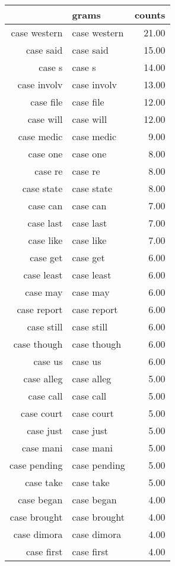 \begin{table}[ht]
\centering
\begin{tabular}{rlr}
  \hline
 & grams & counts \\ 
  \hline
case western & case western & 21.00 \\ 
  case said & case said & 15.00 \\ 
  case s & case s & 14.00 \\ 
  case involv & case involv & 13.00 \\ 
  case file & case file & 12.00 \\ 
  case will & case will & 12.00 \\ 
  case medic & case medic & 9.00 \\ 
  case one & case one & 8.00 \\ 
  case re & case re & 8.00 \\ 
  case state & case state & 8.00 \\ 
  case can & case can & 7.00 \\ 
  case last & case last & 7.00 \\ 
  case like & case like & 7.00 \\ 
  case get & case get & 6.00 \\ 
  case least & case least & 6.00 \\ 
  case may & case may & 6.00 \\ 
  case report & case report & 6.00 \\ 
  case still & case still & 6.00 \\ 
  case though & case though & 6.00 \\ 
  case us & case us & 6.00 \\ 
  case alleg & case alleg & 5.00 \\ 
  case call & case call & 5.00 \\ 
  case court & case court & 5.00 \\ 
  case just & case just & 5.00 \\ 
  case mani & case mani & 5.00 \\ 
  case pending & case pending & 5.00 \\ 
  case take & case take & 5.00 \\ 
  case began & case began & 4.00 \\ 
  case brought & case brought & 4.00 \\ 
  case dimora & case dimora & 4.00 \\ 
  case first & case first & 4.00 \\ 

\end{tabular}
\end{table}
